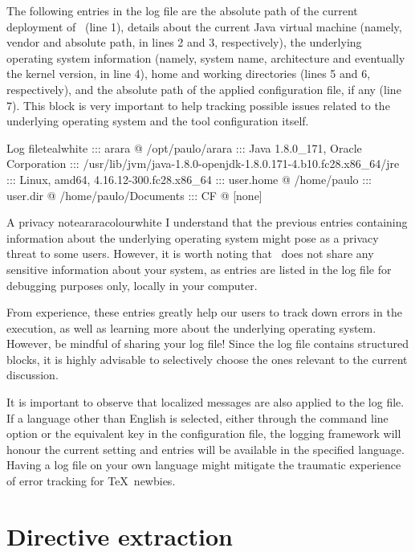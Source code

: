 The following entries in the log file are the absolute path of the current deployment of \arara\ (line 1), details about the current Java virtual machine (namely, vendor and absolute path, in lines 2 and 3, respectively), the underlying operating system information (namely, system name, architecture and eventually the kernel version, in line 4), home and working directories (lines 5 and 6, respectively), and the absolute path of the applied configuration file, if any (line 7). This block is very important to help tracking possible issues related to the underlying operating system and the tool configuration itself.

\begin{codebox}{Log file}{teal}{\icnote}{white}
::: arara @ /opt/paulo/arara
::: Java 1.8.0_171, Oracle Corporation
::: /usr/lib/jvm/java-1.8.0-openjdk-1.8.0.171-4.b10.fc28.x86_64/jre
::: Linux, amd64, 4.16.12-300.fc28.x86_64
::: user.home @ /home/paulo
::: user.dir @ /home/paulo/Documents
::: CF @ [none]
\end{codebox}

\begin{messagebox}{A privacy note}{araracolour}{\icok}{white}
\setlength{\parskip}{1em}
I understand that the previous entries containing information about the underlying operating system might pose as a privacy threat to some users. However, it is worth noting that \arara\ does not share any sensitive information about your system, as entries are listed in the log file for debugging purposes only, locally in your computer.

From experience, these entries greatly help our users to track down errors in the execution, as well as learning more about the underlying operating system. However, be mindful of sharing your log file! Since the log file contains structured blocks, it is highly advisable to selectively choose the ones relevant to the current discussion.
\end{messagebox}

It is important to observe that localized messages are also applied to the log file. If a language other than English is selected, either through the  command line option or the equivalent key in the configuration file, the logging framework will honour the current setting and entries will be available in the specified language. Having a log file on your own language might mitigate the traumatic experience of error tracking for \TeX\ newbies.

\section{Directive extraction}
\label{sec:directiveextraction}

